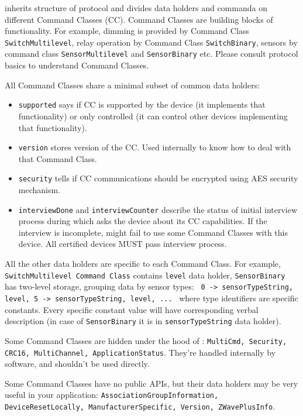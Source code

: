 \zway inherits structure of \zwave protocol and divides data holders and commanda on
different Command Classes (CC). Command Classes are building blocks of \zwave functionality.
For example, dimming is provided by Command Class \texttt{SwitchMultilevel}, relay 
operation by Command Class \texttt{SwitchBinary}, sensors by command class 
\texttt{SensorMultilevel} and \texttt{SensorBinary} etc. Please consult \zwave 
protocol basics to understand \zwave Command Classes.

All Command Classes share a minimal subset of common data holders:

\begin{itemize}
\item \texttt{supported} says if CC is supported by the device (it implements that 
functionality) or only controlled (it can control other devices implementing that 
functionality).
\item \texttt{version} stores version of the CC. Used internally to know how to deal 
with that Command Class.
\item \texttt{security} tells if CC communications should be encrypted using \zwave 
AES security mechanism.
\item \texttt{interviewDone} and \texttt{interviewCounter} describe the status of 
initial interview process during which \zway asks the device about its CC capabilities. 
If the interview is incomplete, \zway might fail to use some Command Classes with this 
device. All \zwave certified devices MUST pass interview process.
\end{itemize}

All the other data holders are specific to each Command Class. For example, 
\texttt{SwitchMultilevel Command Class} contains \texttt{level} data holder, 
\texttt{SensorBinary} has two-level storage, grouping data by sensor types:
\texttt{ 0 -> {sensorTypeString, level}, 5 -> {sensorTypeString, level}, ... }
where type identifiers are \zwave specific constants. Every \zwave specific constant 
value will have corresponding verbal description (in case of \texttt{SensorBinary} it is in 
\texttt{sensorTypeString} data holder).

Some Command Classes are hidden under the hood of \zway: 
\texttt{MultiCmd, Security, CRC16, MultiChannel, ApplicationStatus}. They're handled 
internally by \zway software, and shouldn't be used directly.

Some Command Classes have no public APIs, but their data holders may be very useful 
in your application: \texttt{Association\-Group\-Information, Device\-Reset\-Locally,
Manufacturer\-Specific, Version, ZWavePlusInfo}.

